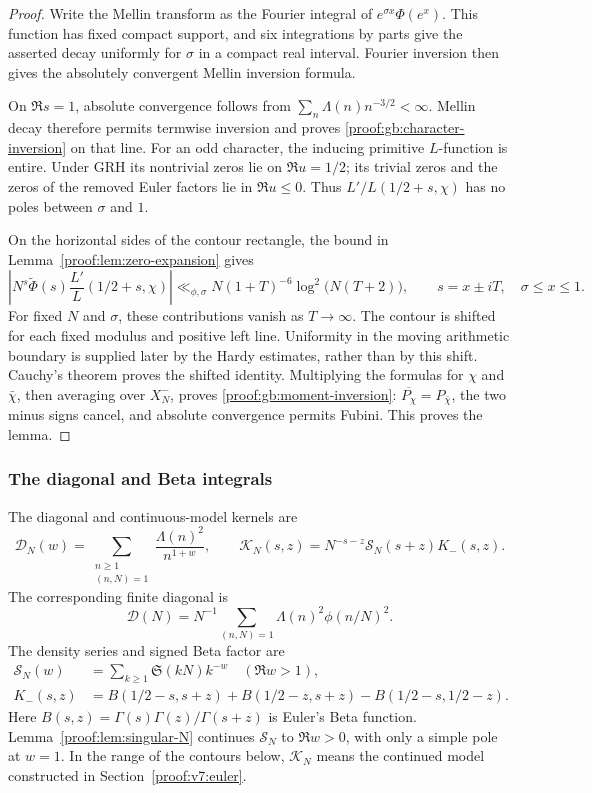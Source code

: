 \documentclass[12pt,a4paper]{amsart}
\numberwithin{equation}{section}
\def\le{\leqslant}
\def\ge{\geqslant}
\theoremstyle{plain}
\theoremstyle{definition}
\theoremstyle{remark}
\begin{document}
\begin{proof}
Write the Mellin transform as the Fourier integral of
$e^{\sigma x}\Phi(e^x)$. This function has fixed compact support, and
six integrations by parts give the asserted decay uniformly for
$\sigma$ in a compact real interval. Fourier inversion then gives
the absolutely convergent Mellin inversion formula.

On $\Re s=1$, absolute convergence follows from
$\sum_n\Lambda(n)n^{-3/2}<\infty$. Mellin decay therefore
permits termwise inversion and proves \eqref{proof:gb:character-inversion} on that line.
For an odd character, the inducing primitive $L$-function is entire.
Under GRH its nontrivial zeros lie on $\Re u=1/2$; its trivial zeros
and the zeros of the removed Euler factors lie in $\Re u\le0$.
Thus $L'/L(1/2+s,\chi)$ has no poles between $\sigma$ and $1$.

On the horizontal sides of the contour rectangle, the bound in
Lemma~\ref{proof:lem:zero-expansion} gives
\[
 \left|N^s\widetilde\Phi(s)\frac{L'}L(1/2+s,\chi)\right|
 \ll_{\phi,\sigma}N(1+T)^{-6}\log^2\bigl(N(T+2)\bigr),
 \qquad s=x\pm iT,\quad\sigma\le x\le1.
\]
For fixed $N$ and $\sigma$, these contributions vanish as $T\to\infty$.
The contour is shifted for each fixed modulus and positive left line.
Uniformity in the moving arithmetic boundary is supplied later by the
Hardy estimates, rather than by this shift.
Cauchy's theorem proves the shifted identity. Multiplying the formulas
for $\chi$ and $\bar\chi$, then averaging over $X_N^-$, proves
\eqref{proof:gb:moment-inversion}: $\overline{P_\chi}=P_{\bar\chi}$,
the two minus signs cancel, and absolute convergence permits Fubini.
This proves the lemma.
\end{proof}

\subsubsection{The diagonal and Beta integrals}
\label{proof:sec:goldbach-main}\label{proof:v7:main-term-evaluation}

The diagonal and continuous-model kernels are
\[
 \mathscr D_N(w)=\sum_{\substack{n\ge1\\(n,N)=1}}
                    \frac{\Lambda(n)^2}{n^{1+w}},\qquad
 \mathscr K_N(s,z)=N^{-s-z}\mathscr S_N(s+z)K_-(s,z).
\]
The corresponding finite diagonal is
\[
 \mathcal D(N)=N^{-1}\sum_{(n,N)=1}\Lambda(n)^2\phi(n/N)^2.
\]
The density series and signed Beta factor are
\[
 \begin{aligned}
 \mathscr S_N(w)&=\sum_{k\ge1}\mathfrak S(kN)k^{-w}
                                      \quad(\Re w>1),\\
 K_-(s,z)&=B(1/2-s,s+z)+B(1/2-z,s+z)
                           -B(1/2-s,1/2-z).
 \end{aligned}
\]
Here $B(s,z)=\Gamma(s)\Gamma(z)/\Gamma(s+z)$ is Euler's Beta
function. Lemma~\ref{proof:lem:singular-N} continues $\mathscr S_N$
to $\Re w>0$, with only a simple pole at $w=1$. In the range of
the contours below, $\mathscr K_N$ means the continued model
constructed in Section~\ref{proof:v7:euler}.
\end{document}
